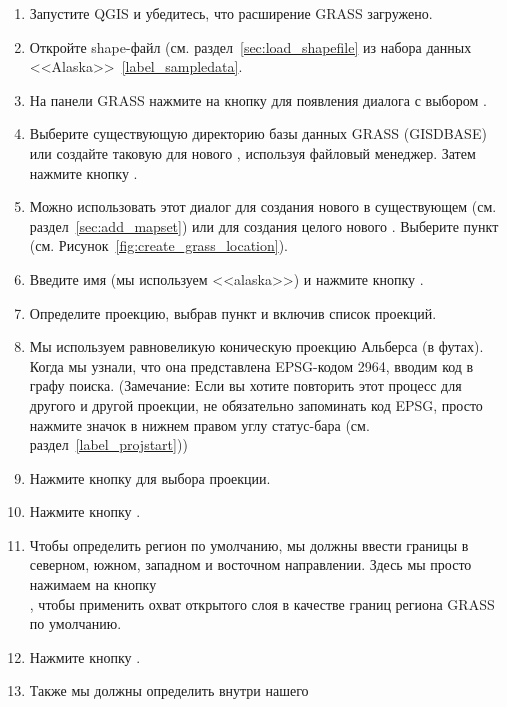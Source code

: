 \begin{enumerate}
  \item Запустите QGIS и убедитесь, что расширение GRASS загружено.
  \item Откройте shape-файл  (см. раздел~\ref{sec:load_shapefile}
  из набора данных <<Alaska>>~\ref{label_sampledata}.
  \item На панели GRASS нажмите на кнопку 
  для появления диалога с выбором .
  \item Выберите существующую директорию базы данных GRASS (GISDBASE)
   или создайте таковую для нового ,
  используя файловый менеджер. Затем нажмите кнопку .
  \item Можно использовать этот диалог для создания нового 
  в существующем  (см. раздел~\ref{sec:add_mapset}) или
  для создания целого нового . Выберите пункт
   (см. Рисунок~\ref{fig:create_grass_location}).
  \item Введите имя  (мы используем <<alaska>>) и
  нажмите кнопку .
  \item Определите проекцию, выбрав пункт 
  и включив список проекций.
  \item Мы используем равновеликую коническую проекцию Альберса (в футах).
  Когда мы узнали, что она представлена EPSG-кодом 2964, вводим код в
  графу поиска. (Замечание: Если вы хотите повторить этот процесс для
  другого  и другой проекции, не обязательно запоминать
  код EPSG, просто нажмите значок
  в нижнем правом углу статус-бара (см. раздел~\ref{label_projstart}))
  \item Нажмите кнопку  для выбора проекции.
  \item Нажмите кнопку .
  \item Чтобы определить регион по умолчанию, мы должны ввести границы
   в северном, южном, западном и восточном направлении.
  Здесь мы просто нажимаем на кнопку \\
  , чтобы применить охват
  открытого слоя  в качестве границ региона GRASS
  по умолчанию.
  \item Нажмите кнопку .
  \item Также мы должны определить  внутри нашего

\end{enumerate}
